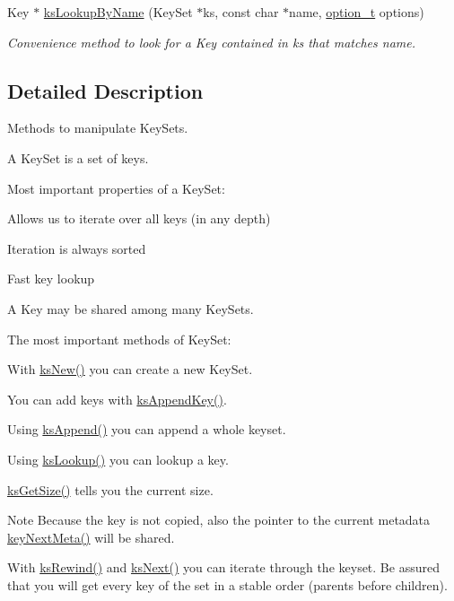 \begin{DoxyCompactItemize}
Key $\ast$ \hyperlink{group__keyset_gad2e30fb6d4739d917c5abb2ac2f9c1a1}{ks\+Lookup\+By\+Name} (Key\+Set $\ast$ks, const char $\ast$name, \hyperlink{group__keyset_ga98a3d6a4016c9dad9cbd1a99a9c2a45a}{option\+\_\+t} options)
\begin{DoxyCompactList}\small\item\em Convenience method to look for a Key contained in {\ttfamily ks} that matches {\ttfamily name}. \end{DoxyCompactList}\end{DoxyCompactItemize}


\subsection{Detailed Description}
Methods to manipulate Key\+Sets. 

A Key\+Set is a set of keys.

Most important properties of a Key\+Set\+:


\begin{DoxyItemize}
\item Allows us to iterate over all keys (in any depth)
\item Iteration is always sorted
\item Fast key lookup
\item A Key may be shared among many Key\+Sets.
\end{DoxyItemize}

The most important methods of Key\+Set\+:


\begin{DoxyItemize}
\item With \hyperlink{group__keyset_ga671e1aaee3ae9dc13b4834a4ddbd2c3c}{ks\+New()} you can create a new Key\+Set.
\item You can add keys with \hyperlink{group__keyset_gaa5a1d467a4d71041edce68ea7748ce45}{ks\+Append\+Key()}.
\item Using \hyperlink{group__keyset_ga21eb9c3a14a604ee3a8bdc779232e7b7}{ks\+Append()} you can append a whole keyset.
\item Using \hyperlink{group__keyset_gaa34fc43a081e6b01e4120daa6c112004}{ks\+Lookup()} you can lookup a key.
\item \hyperlink{group__keyset_ga7474ad6b0a0fa969dbdf267ba5770eee}{ks\+Get\+Size()} tells you the current size.
\end{DoxyItemize}

\begin{DoxyNote}{Note}
Because the key is not copied, also the pointer to the current metadata \hyperlink{group__keymeta_ga4c88342f580a4291455a801af71ce048}{key\+Next\+Meta()} will be shared.
\end{DoxyNote}
With \hyperlink{group__keyset_gabe793ff51f1728e3429c84a8a9086b70}{ks\+Rewind()} and \hyperlink{group__keyset_ga317321c9065b5a4b3e33fe1c399bcec9}{ks\+Next()} you can iterate through the keyset. Be assured that you will get every key of the set in a stable order (parents before children).

